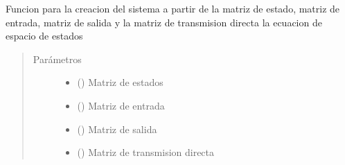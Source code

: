 \documentclass[letterpaper,10pt,spanish]{sphinxmanual}
\begin{document}
\begin{fulllineitems}
\label{\detokenize{codigos/rutinas_analisis:rutinas_analisis.system_creator_ss}}
Funcion para la creacion del sistema a partir de la matriz de estado, matriz de entrada, matriz de salida y la matriz de transmision directa la ecuacion de espacio de estados
\begin{quote}\begin{description}
\item[{Parámetros}] \leavevmode\begin{itemize}
\item {} 
 () \textendash{} Matriz de estados

\item {} 
 () \textendash{} Matriz de entrada

\item {} 
 () \textendash{} Matriz de salida

\item {} 
 () \textendash{} Matriz de transmision directa

\end{itemize}

\end{description}\end{quote}

\end{fulllineitems}

\end{document}
